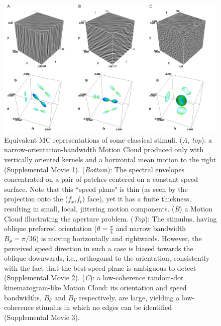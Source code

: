 \documentclass[a4paper,11pt]{article}%
\begin{document}
\begin{figure}%
\includegraphics[width=\textwidth]{figure3}%
	 \caption{Equivalent MC representations of some classical stimuli. (\textit{A}, \textit{top}): a narrow-orientation-bandwidth Motion Cloud produced only with vertically oriented kernels and a horizontal mean motion to the right (Supplemental Movie 1). (\textit{Bottom}): The spectral envelopes concentrated on a pair of patches centered on a constant speed surface. Note that this ``speed plane" is thin (as seen by the projection onto the ($f_x$,$f_t$) face), yet it has a finite thickness, resulting in small, local, jittering motion components. ({\textit{B}}) a Motion Cloud illustrating the aperture problem. (\textit{Top}): The stimulus, having oblique preferred orientation ($\theta=\frac{\pi}{4}$ and narrow bandwidth $B_{\theta}=\pi/36$) is moving horizontally and rightwards. However, the perceived speed direction in such a case is biased towards the oblique downwards, i.e., orthogonal to the orientation, consistently with the fact that the best speed plane is ambiguous to detect (Supplemental Movie 2). (\textit{C}): a low-coherence random-dot kinematogram-like Motion Cloud: its orientation and speed bandwidths, $B_{\theta}$ and $B_{V}$ respectively, are large, yielding a low-coherence stimulus in which no edges can be identified (Supplemental Movie 3).} %
	 \label{fig:examples} %
\end{figure} %
\end{document}
